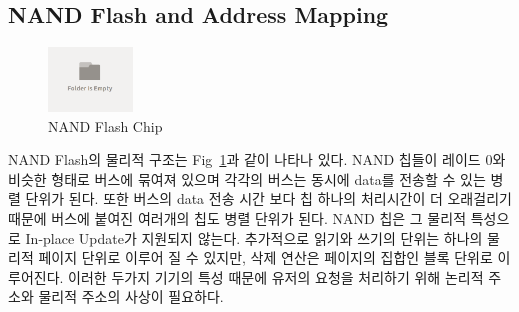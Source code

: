 \documentclass[conference]{IEEEtran}
\begin{document}
\subsection{NAND Flash and Address Mapping}
\begin{figure}[h]
	\centering
	\includegraphics[width=0.2\textwidth]{image/bg.png}
	\caption{NAND Flash Chip}
	\label{fig:chips}
\end{figure}
NAND Flash의 물리적 구조는 Fig~\ref{fig:chips}과 같이 나타나 있다. NAND 칩들이 레이드 0와 비슷한 형태로 버스에 묶여져 있으며 각각의 버스는 동시에 data를 전송할 수 있는 병렬 단위가 된다. 또한 버스의 data 전송 시간 보다 칩 하나의 처리시간이 더 오래걸리기 때문에 버스에 붙여진 여러개의 칩도 병렬 단위가 된다. NAND 칩은 그 물리적 특성으로 In-place Update가 지원되지 않는다. 추가적으로 읽기와 쓰기의 단위는 하나의 물리적 페이지 단위로 이루어 질 수 있지만, 삭제 연산은 페이지의 집합인 블록 단위로 이루어진다. 이러한 두가지 기기의 특성 때문에 유저의 요청을 처리하기 위해 논리적 주소와 물리적 주소의 사상이 필요하다. \par
\end{document}
